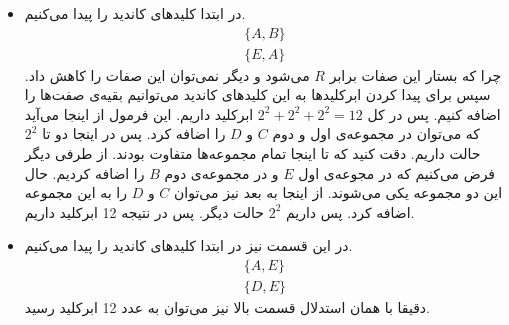 \begin{itemize}
    \item در ابتدا کلید‌های کاندید را پیدا می‌کنیم.
    \begin{gather*}
        \{A, B\}\\
        \{E, A\}
    \end{gather*}
    چرا که بستار این صفات برابر
    $R$
    می‌شود و دیگر نمی‌توان این صفات را کاهش داد.
    سپس برای پیدا کردن ابرکلید‌ها به این کلید‌های کاندید می‌توانیم بقیه‌ی صفت‌ها را اضافه کنیم. پس در کل
    $2^2 + 2^2 + 2^2 = 12$
    ابرکلید داریم. این فرمول از اینجا می‌آید که می‌توان در مجموعه‌ی اول و دوم
    $C$ و $D$
    را اضافه کرد. پس در اینجا دو تا
    $2^2$
    حالت داریم. دقت کنید که تا اینجا تمام مجموعه‌ها متفاوت بودند. از طرفی دیگر فرض می‌کنیم که در مجوعه‌ی اول
    $E$
    و در مجموعه‌ی دوم
    $B$
    را اضافه کردیم. حال این دو مجموعه یکی می‌شوند. از اینجا به بعد نیز می‌توان
    $C$ و $D$
    را به این مجموعه اضافه کرد. پس داریم
    $2^2$
    حالت دیگر.
    پس در نتیجه 12 ابرکلید داریم.
    \item در این قسمت نیز در ابتدا کلید‌های کاندید را پیدا می‌کنیم.
    \begin{gather*}
        \{A, E\}\\
        \{D, E\}
    \end{gather*}
    دقیقا با همان استدلال قسمت بالا نیز می‌توان به عدد 12 ابرکلید رسید.
\end{itemize}
